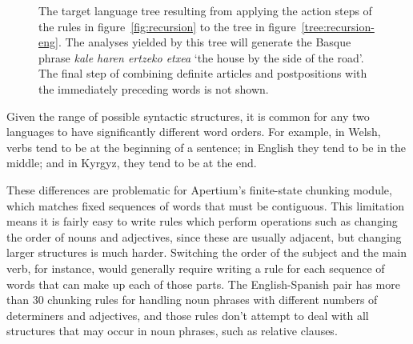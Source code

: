 \documentclass[free]{flammie}
\newcommand{\node}[1]{\begin{tabular}{c}#1\end{tabular}}
\begin{document}
\begin{figure}
\begin{minipage}{\textwidth}
    \centering
        \caption{The target language tree resulting from applying the action
        steps of the rules in figure~\ref{fig:recursion} to the tree in
        figure~\ref{tree:recursion-eng}.  The analyses yielded by this tree will
        generate the Basque phrase \emph{kale haren ertzeko etxea} `the house by
        the side of the road'. The final step of combining definite articles and
        postpositions with the immediately preceding words is not
        shown.}\label{tree:recursion-eus}
    \end{minipage}

\end{figure}

Given the range of possible syntactic structures, it is common for any two
languages to have significantly different word orders.  For example, in Welsh,
verbs tend to be at the beginning of a sentence; in English they tend to be in
the middle; and in Kyrgyz, they tend to be at the end.

These differences are problematic for Apertium's finite-state chunking module,
which matches fixed sequences of words that must be contiguous.  This limitation
means it is fairly easy to write rules which perform operations such as changing
the order of nouns and adjectives, since these are usually adjacent, but
changing larger structures is much harder. Switching the order of the subject
and the main verb, for instance, would generally require writing a rule for each
sequence of words that can make up each of those parts. The English-Spanish pair
has more than 30 chunking rules for handling noun phrases with different numbers
of determiners and adjectives, and those rules don't attempt to deal with all
structures that may occur in noun phrases, such as relative clauses.
\end{document}

